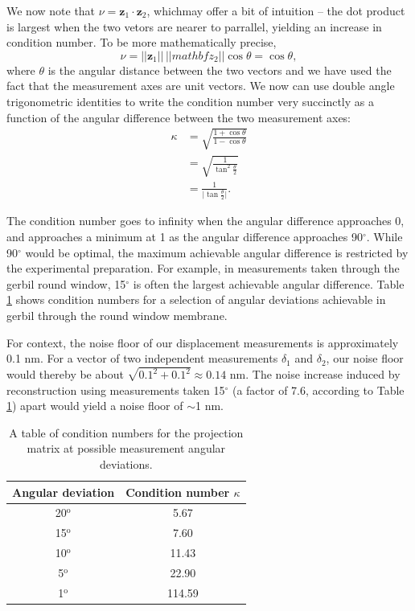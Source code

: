 \documentclass[preprint,NumberedRefs]{JASA}
\begin{document}
\par{We now note that $\nu = \mathbf{z}_1\cdot\mathbf{z}_2$, whichmay offer a bit of intuition -- the dot product is largest when the two vetors are nearer to parrallel, yielding an increase in condition number. To be more mathematically precise,
	\begin{equation}
		\nu = ||\mathbf{z}_1||\,||mathbf{z}_2||\cos{\theta} = \cos{\theta},
	\end{equation}
where $\theta$ is the angular distance between the two vectors and we have used the fact that the measurement axes are unit vectors. We now can use double angle trigonometric identities to write the condition number very succinctly as a function of the angular difference between the two measurement axes:
	\begin{align}
		\kappa &= \sqrt{\frac{1+\cos\theta}{1-\cos\theta}}\\
			   &=\sqrt{\frac{1}{\tan^2\frac{\theta}{2}}}\\
			   &=\frac{1}{\bigg|\tan\frac{\theta}{2}\bigg|}.
	\end{align}
}
\par{The condition number goes to infinity when the angular difference approaches 0, and approaches a minimum at 1 as the angular difference approaches 90$^\circ$. While 90$^\circ$ would be optimal, the maximum achievable angular difference is restricted by the experimental preparation. For example, in measurements taken through the gerbil round window, 15$^\circ$ is often the largest achievable angular difference. Table \ref{kappas} shows condition numbers for a selection of angular deviations achievable in gerbil through the round window membrane.}
\par{For context, the noise floor of our displacement measurements is approximately 0.1 nm. For a vector of two independent measurements $\delta_1$ and $\delta_2$, our noise floor would thereby be about $\sqrt{0.1^2 + 0.1^2}\approx0.14$ nm. The noise increase induced by reconstruction using measurements taken 15$^\circ$ (a factor of 7.6, according to Table \ref{kappas}) apart would yield a noise floor of $\sim$1 nm.}

\begin{table}
\begin{center}
    \begin{tabular}{|c|c|}
        \hline
        Angular deviation & Condition number $\kappa$ \\
        \hline
        20$^\text{o}$ & 5.67\\
        15$^\text{o}$ & 7.60\\
        10$^\text{o}$ & 11.43\\
        5$^\text{o}$ & 22.90 \\
        1$^\text{o}$ & 114.59\\
        \hline
    \end{tabular}
    \caption{A table of condition numbers for the projection matrix at possible measurement angular deviations.}
\label{kappas}
\end{center}
\end{table}
\end{document}

